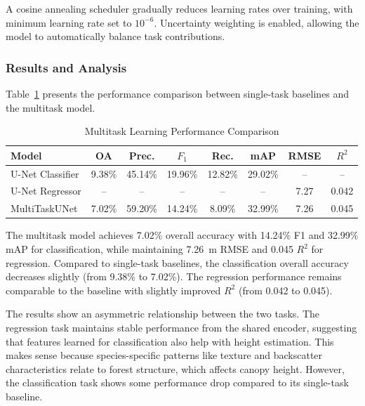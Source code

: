 A cosine annealing scheduler gradually reduces learning rates over training, with minimum learning rate set to $10^{-6}$. Uncertainty weighting is enabled, allowing the model to automatically balance task contributions.

\subsubsection{Results and Analysis}

Table~\ref{tab:mtl_comparison} presents the performance comparison between single-task baselines and the multitask model.

\begin{table}[htbp]
\centering
\caption{Multitask Learning Performance Comparison}
\label{tab:mtl_comparison}
\begin{tabular}{lccccccc}
\hline
\textbf{Model} & \textbf{OA} & \textbf{Prec.} & \textbf{$F_1$} & \textbf{Rec.} & \textbf{mAP} & \textbf{RMSE} & \textbf{$R^2$} \\
\hline
U-Net Classifier & 9.38\% & 45.14\% & 19.96\% & 12.82\% & 29.02\% & -- & -- \\
U-Net Regressor & -- & -- & -- & -- & -- & 7.27 & 0.042 \\
MultiTaskUNet & 7.02\% & 59.20\% & 14.24\% & 8.09\% & 32.99\% & 7.26 & 0.045 \\
\hline
\end{tabular}
\end{table}

The multitask model achieves 7.02\% overall accuracy with 14.24\% F1 and 32.99\% mAP for classification, while maintaining 7.26~m RMSE and 0.045 $R^2$ for regression. Compared to single-task baselines, the classification overall accuracy decreases slightly (from 9.38\% to 7.02\%). The regression performance remains comparable to the baseline with slightly improved $R^2$ (from 0.042 to 0.045).

The results show an asymmetric relationship between the two tasks. The regression task maintains stable performance from the shared encoder, suggesting that features learned for classification also help with height estimation. This makes sense because species-specific patterns like texture and backscatter characteristics relate to forest structure, which affects canopy height. However, the classification task shows some performance drop compared to its single-task baseline.

